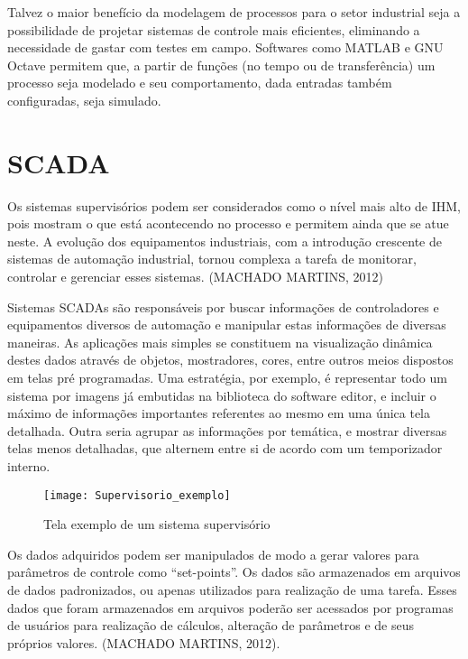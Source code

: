 Talvez o maior benefício da modelagem de processos para o setor industrial seja a possibilidade de projetar sistemas de controle mais eficientes, eliminando a necessidade de gastar com testes em campo. Softwares como MATLAB e GNU Octave permitem que, a partir de funções (no tempo ou de transferência) um processo seja modelado e seu comportamento, dada entradas também configuradas, seja simulado.

\section{SCADA}

Os sistemas supervisórios podem ser considerados como o nível mais alto de IHM, pois mostram o que está acontecendo no processo e permitem ainda que se atue neste. A evolução dos equipamentos industriais, com a introdução crescente de sistemas de automação industrial, tornou complexa a tarefa de monitorar, controlar e gerenciar esses sistemas. (MACHADO MARTINS, 2012)

Sistemas SCADAs são responsáveis por buscar informações de controladores e equipamentos diversos de automação e manipular estas informações de diversas maneiras. As aplicações mais simples se constituem na visualização dinâmica destes dados através de objetos, mostradores, cores, entre outros meios dispostos em telas pré programadas. Uma estratégia, por exemplo, é representar todo um sistema por imagens já embutidas na biblioteca do software editor, e incluir o máximo de informações importantes referentes ao mesmo em uma única tela detalhada. Outra seria agrupar as informações por temática, e mostrar diversas telas menos detalhadas, que alternem entre si de acordo com um temporizador interno.

\begin{figure}
	\centering
	\texttt{[image: Supervisorio\_exemplo]}
	\caption[Fonte: https://www.agaads.com/service/scada-system/]{Tela exemplo de um sistema supervisório}
	\label{img_supervisorio_exemplo}
\end{figure}

Os dados adquiridos podem ser manipulados de modo a gerar valores para parâmetros de  controle  como “set-points”. Os  dados são  armazenados em  arquivos de dados padronizados, ou apenas utilizados para realização de uma tarefa. Esses dados que foram armazenados em arquivos poderão ser acessados por programas de usuários para realização de cálculos, alteração de parâmetros e de seus próprios valores. (MACHADO MARTINS, 2012).

